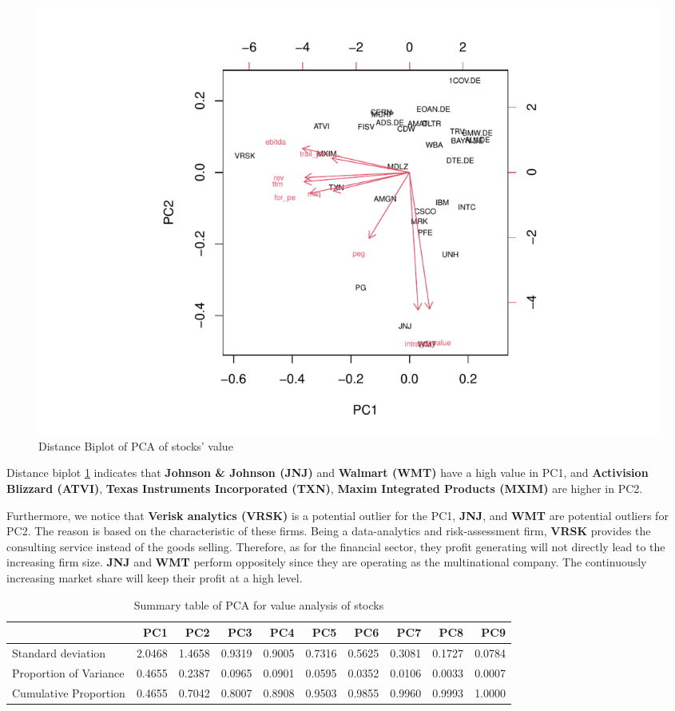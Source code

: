 \documentclass[11pt,a4paper,]{article}
\begin{document}
\begin{figure}
\centering
\includegraphics{ass2_files/figure-latex/bi-dis-1.pdf}
\caption{\label{fig:bi-dis}Distance Biplot of PCA of stocks' value}
\end{figure}

Distance biplot \ref{fig:bi-dis} indicates that \textbf{Johnson \& Johnson (JNJ)} and \textbf{Walmart (WMT)} have a high value in PC1, and \textbf{Activision Blizzard (ATVI)}, \textbf{Texas Instruments Incorporated (TXN)}, \textbf{Maxim Integrated Products (MXIM)} are higher in PC2.

Furthermore, we notice that \textbf{Verisk analytics (VRSK)} is a potential outlier for the PC1, \textbf{JNJ}, and \textbf{WMT} are potential outliers for PC2. The reason is based on the characteristic of these firms. Being a data-analytics and risk-assessment firm, \textbf{VRSK} provides the consulting service instead of the goods selling. Therefore, as for the financial sector, they profit generating will not directly lead to the increasing firm size. \textbf{JNJ} and \textbf{WMT} perform oppositely since they are operating as the multinational company. The continuously increasing market share will keep their profit at a high level.

\begin{table}

\caption{\label{tab:lim-1}Summary table of PCA for value analysis of stocks}
\centering
\begin{tabular}[t]{>{\raggedright\arraybackslash}p{70px}|r|r|r|r|r|r|r|r|r}
\hline
  & PC1 & PC2 & PC3 & PC4 & PC5 & PC6 & PC7 & PC8 & PC9\\
\hline
Standard deviation & 2.0468 & 1.4658 & 0.9319 & 0.9005 & 0.7316 & 0.5625 & 0.3081 & 0.1727 & 0.0784\\
\hline
Proportion of Variance & 0.4655 & 0.2387 & 0.0965 & 0.0901 & 0.0595 & 0.0352 & 0.0106 & 0.0033 & 0.0007\\
\hline
Cumulative Proportion & 0.4655 & 0.7042 & 0.8007 & 0.8908 & 0.9503 & 0.9855 & 0.9960 & 0.9993 & 1.0000\\
\hline
\end{tabular}
\end{table}
\end{document}

